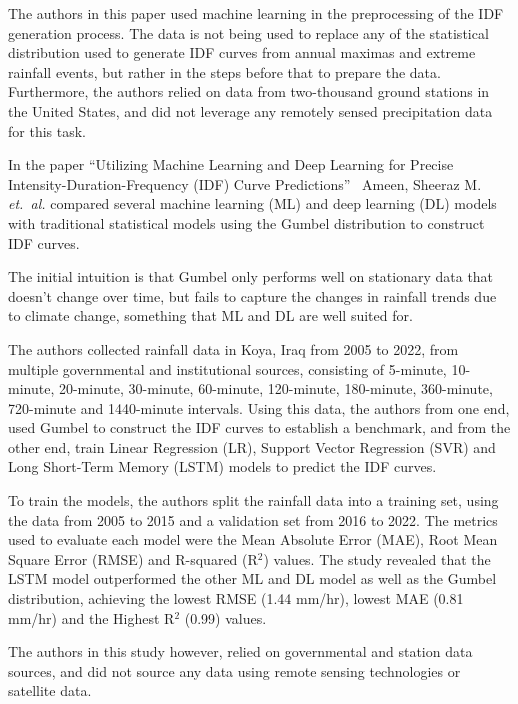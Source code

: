 The authors in this paper used machine learning in the preprocessing of the IDF generation process. The data is not being used to replace any of the statistical distribution used to generate IDF curves from  annual maximas and extreme rainfall events, but rather in the steps before that to prepare the data. Furthermore, the authors relied on data from two-thousand ground stations in the United States, and did not leverage any remotely sensed precipitation data for this task.

\vspace{1em}

In the paper ``Utilizing Machine Learning and Deep Learning for Precise Intensity-Duration-Frequency (IDF) Curve Predictions''~\cite{idfkoya} Ameen, Sheeraz M. \emph{et.~al.} compared several machine learning (ML) and deep learning (DL) models with traditional statistical models using the Gumbel distribution to construct IDF curves.

The initial intuition is that Gumbel only performs well on stationary data that doesn't change over time, but fails to capture the changes in rainfall trends due to climate change, something that ML and DL are well suited for.~\cite{idfkoya}

The authors collected rainfall data in Koya, Iraq from 2005 to 2022, from multiple governmental and institutional sources, consisting of 5-minute, 10-minute, 20-minute, 30-minute, 60-minute, 120-minute, 180-minute, 360-minute, 720-minute and 1440-minute intervals. Using this data, the authors from one end, used Gumbel to construct the IDF curves to establish a benchmark, and from the other end, train Linear Regression (LR), Support Vector Regression (SVR) and Long Short-Term Memory (LSTM) models to predict the IDF curves.~\cite{idfkoya}

To train the models, the authors split the rainfall data into a training set, using the data from 2005 to 2015 and a validation set from 2016 to 2022. The metrics used to evaluate each model were the Mean Absolute Error (MAE), Root Mean Square Error (RMSE) and R-squared (R$^{2}$) values. The study revealed that the LSTM model outperformed the other ML and DL model as well as the Gumbel distribution, achieving the lowest RMSE (1.44 mm/hr), lowest MAE (0.81 mm/hr) and the Highest R$^{2}$ (0.99) values.~\cite{idfkoya}

The authors in this study however, relied on governmental and station data sources, and did not source any data using remote sensing technologies or satellite data.

\vspace{1em}

